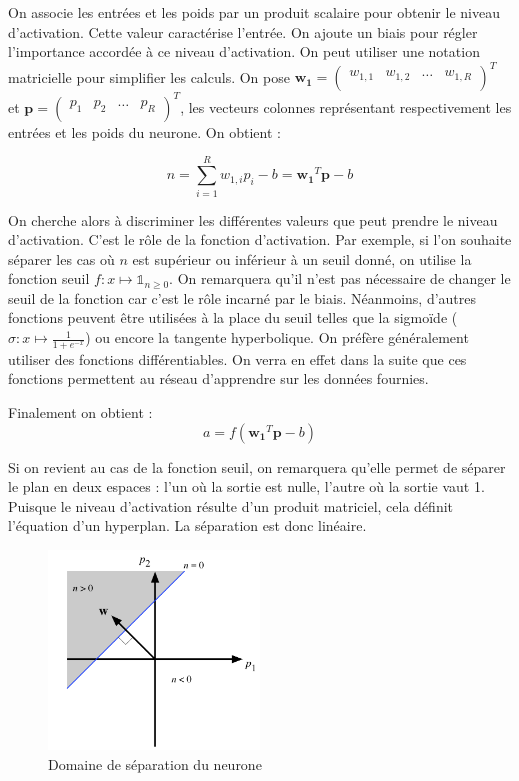 On associe les entrées et les poids par un produit scalaire pour obtenir le niveau d'activation. Cette valeur caractérise l'entrée.
On ajoute un biais pour régler l'importance accordée à ce niveau d'activation. On peut utiliser une notation matricielle pour simplifier les calculs.
On pose $\mathbf{w_1} =
\begin{pmatrix}
  w_{1,1} & w_{1,2} & \ldots & w_{1,R}\\
\end{pmatrix}^T $ 
et
$ \mathbf{p} = 
\begin{pmatrix}
 p_1 & p_2 & \ldots & p_R \\
\end{pmatrix}^T $, 
les vecteurs colonnes représentant respectivement les entrées et les poids du neurone. On obtient :

\begin{equation} 
n = \sum_{i=1}^{R} w_{1,i} p_i - b = \mathbf{w_1}^T \mathbf{p} - b
\end{equation}

On cherche alors à discriminer les différentes valeurs que peut prendre le niveau d'activation. C'est le rôle de la fonction d'activation. Par exemple, si l'on souhaite séparer les cas où $n$ est supérieur ou inférieur à un seuil donné, on utilise la fonction seuil $ f : x \mapsto \mathds{1}_{n \geq 0} $. On remarquera qu'il n'est pas nécessaire de changer le seuil de la fonction car c'est le rôle incarné par le biais. Néanmoins, d'autres fonctions peuvent être utilisées à la place du seuil telles que la sigmoïde ($\sigma : x \mapsto \frac{1}{1+e^{-x}}$) ou encore la tangente hyperbolique.
On préfère généralement utiliser des fonctions différentiables. On verra en effet dans la suite que ces fonctions permettent au réseau d'apprendre sur les données fournies.

Finalement on obtient :
\begin{equation}
 a = f\left(\mathbf{w_1}^T \mathbf{p} - b\right)
\end{equation}

Si on revient au cas de la fonction seuil, on remarquera qu'elle permet de séparer le plan en deux espaces : l'un où la sortie est nulle, l'autre où la sortie vaut 1. Puisque le niveau d'activation résulte d'un produit matriciel, cela définit l'équation d'un hyperplan. La séparation est donc linéaire.

\begin{figure}[h]
 \centering
 \includegraphics[width=0.5\textwidth]{img/separation_lineaire_du_plan.png}
 \caption{Domaine de séparation du neurone}
\end{figure}

